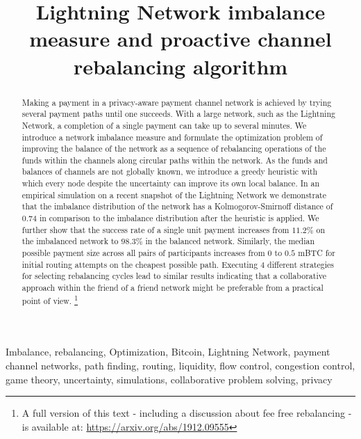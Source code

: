 \documentclass[conference]{IEEEtran}
\title{Lightning Network imbalance measure and proactive channel rebalancing algorithm}
\begin{document}
 

\author{
\and
{}
}

\maketitle
\begin{abstract}
Making a payment in a privacy-aware payment channel network is achieved by trying several payment paths until one succeeds.
With a large network, such as the Lightning Network, a completion of a single payment can take up to several minutes.
We introduce a network imbalance measure and formulate the optimization problem of improving the balance of the network as a sequence of rebalancing operations of the funds within the channels along circular paths within the network.
As the funds and balances of channels are not globally known, we introduce a greedy heuristic with which every node despite the uncertainty can improve its own local balance.
In an empirical simulation on a recent snapshot of the Lightning Network we demonstrate that the imbalance distribution of the network has a Kolmogorov-Smirnoff distance of $0.74$ in comparison to the imbalance distribution after the heuristic is applied.
We further show that the success rate of a single unit payment increases from $11.2\%$ on the imbalanced network to $98.3\%$ in the balanced network.
 Similarly, the median possible payment size across all pairs of participants increases from $0$ to $0.5$ mBTC for initial routing attempts on the cheapest possible path.
Executing $4$ different strategies for selecting rebalancing cycles lead to similar results 
indicating that a collaborative approach within the friend of a friend network might be preferable from a practical point of view. \footnote{A full version of this text - including a discussion about fee free rebalancing - is available at: \url{https://arxiv.org/abs/1912.09555}}

\end{abstract}
\begin{IEEEkeywords}
Imbalance, rebalancing, Optimization, Bitcoin, Lightning Network, payment channel networks, path finding, routing, liquidity, flow control, congestion control, game theory, uncertainty, simulations, collaborative problem solving, privacy 
\end{IEEEkeywords}
\end{document}
